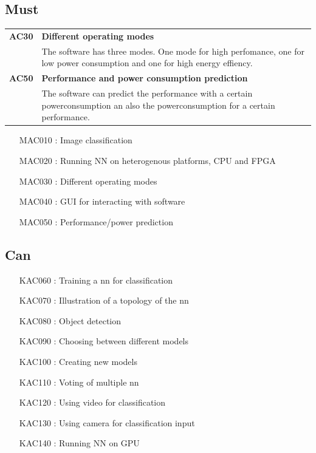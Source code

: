\documentclass[parskip=full]{scrartcl}
\begin{document}
\subsection{Must}
\begin{tabular}{p{2cm}p{12cm}}
\textbf{AC30} & \textbf{Different operating modes} \\
& The software has three modes. One mode for high perfomance, one for low power consumption and one for high energy effiency. \\
\textbf{AC50} & \textbf{Performance and power consumption prediction}\\
& The software can predict the performance with a certain powerconsumption an also the powerconsumption for a certain performance.
\end{tabular}
\begin{itemize}[nosep]
\item [MAC010]: Image classification
\item [MAC020]: Running NN on heterogenous platforms, CPU and FPGA
\item [MAC030]: Different operating modes
\item [MAC040]: GUI for interacting with software
\item [MAC050]: Performance/power prediction
\end{itemize}

\subsection{Can}
\begin{itemize}[nosep]
\item [KAC060]: Training a nn for classification
\item [KAC070]: Illustration of a topology of the nn
\item [KAC080]: Object detection
\item [KAC090]: Choosing between different models
\item [KAC100]: Creating new models
\item [KAC110]: Voting of multiple nn
\item [KAC120]: Using video for classification
\item [KAC130]: Using camera for classification input
\item [KAC140]: Running NN on GPU
\end{itemize}
\end{document}
